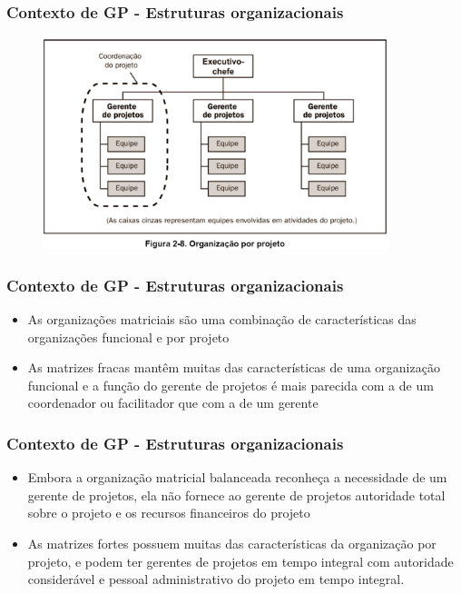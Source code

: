   
  \begin{frame}
 \frametitle{Contexto de GP - Estruturas organizacionais}
 \begin{figure}
  \centering
  \includegraphics[width = 0.9\textwidth]{figs/fig7.png}
 \end{figure}
\end{frame}

  
  \begin{frame}
   \frametitle{Contexto de GP
- Estruturas organizacionais}
   \begin{itemize}
    \item As organizações matriciais são uma combinação de características das organizações funcional e por projeto
    \item As matrizes fracas mantêm muitas das características de uma organização funcional e a função do gerente de projetos é mais parecida com a de um coordenador ou facilitador que com a de um gerente
  
   \end{itemize}
  \end{frame}
  
    \begin{frame}
   \frametitle{Contexto de GP
- Estruturas organizacionais}
   \begin{itemize}
    \item Embora a organização matricial balanceada reconheça a necessidade de um gerente de projetos, ela não fornece ao gerente de projetos autoridade total sobre o projeto e os recursos financeiros do projeto
    \item As matrizes fortes possuem muitas das características da organização por projeto, e podem ter gerentes de projetos em tempo integral com autoridade considerável e pessoal administrativo do projeto em tempo integral. 
   \end{itemize}
  \end{frame}
  
